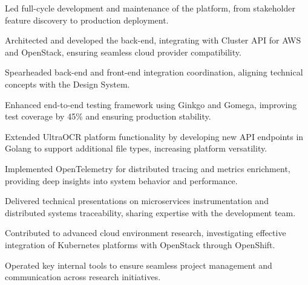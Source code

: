 \documentclass[]{deedy-resume-pdflatex}
\begin{document}
\begin{minipage}[t]{0.65\textwidth}

\vspace{\topsep} %
\begin{tightemize}
\item Led full-cycle development and maintenance of the platform, from stakeholder feature discovery to production deployment.
\item Architected and developed the back-end, integrating with Cluster API for AWS and OpenStack, ensuring seamless cloud provider compatibility.
\item Spearheaded back-end and front-end integration coordination, aligning technical concepts with the Design System.
\item Enhanced end-to-end testing framework using Ginkgo and Gomega, improving test coverage by 45\% and ensuring production stability.
\end{tightemize}
\sectionsep


\vspace{\topsep} %
\begin{tightemize}
\item Extended UltraOCR platform functionality by developing new API endpoints in Golang to support additional file types, increasing platform versatility.
\item Implemented OpenTelemetry for distributed tracing and metrics enrichment, providing deep insights into system behavior and performance.
\item Delivered technical presentations on microservices instrumentation and distributed systems traceability, sharing expertise with the development team.
\end{tightemize}
\sectionsep


\vspace{\topsep} %
\begin{tightemize}
\item Contributed to advanced cloud environment research, investigating effective integration of Kubernetes platforms with OpenStack through OpenShift.
\item Operated key internal tools to ensure seamless project management and communication across research initiatives.
\end{tightemize}
\sectionsep


\end{minipage}
\end{document}
